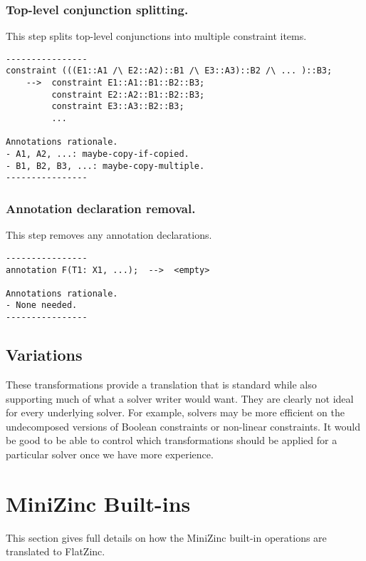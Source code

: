\documentclass[10pt]{article}
\begin{document}
\subsubsection{Top-level conjunction splitting.}
This step splits top-level conjunctions into multiple constraint items.

\begin{verbatim}
----------------
constraint (((E1::A1 /\ E2::A2)::B1 /\ E3::A3)::B2 /\ ... )::B3;
    -->  constraint E1::A1::B1::B2::B3;
         constraint E2::A2::B1::B2::B3;
         constraint E3::A3::B2::B3;
         ...

Annotations rationale.
- A1, A2, ...: maybe-copy-if-copied.
- B1, B2, B3, ...: maybe-copy-multiple.
----------------
\end{verbatim}

\subsubsection{Annotation declaration removal.}
This step removes any annotation declarations.

\begin{verbatim}
----------------
annotation F(T1: X1, ...);  -->  <empty>

Annotations rationale.
- None needed.
----------------
\end{verbatim}

\subsection{Variations}
These transformations provide a translation that is standard while also
supporting much of what a solver writer would want.  They are clearly not
ideal for every underlying solver.  For example, solvers may be more
efficient on the undecomposed versions of Boolean constraints
or non-linear constraints.  It would be good to be able to control which
transformations should be applied for a particular solver once we have more
experience.

\section{MiniZinc Built-ins}
  \label{MiniZinc Built-ins}
This section gives full details on how the MiniZinc built-in operations
are translated to FlatZinc.
\end{document}
